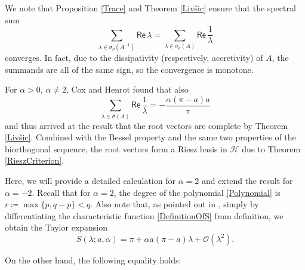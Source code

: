 \documentclass[11pt, a4paper,reqno]{amsart}
\theoremstyle{plain}
\theoremstyle{definition}
\theoremstyle{remark}
\newcommand{\1}{\mathds 1}
\renewcommand{\Re}{\mathsf{Re}\,}
\begin{document}
We note that Proposition \ref{Trace} and Theorem \ref{Livšic} ensure that the spectral sum
\[
\sum_{\lambda \in \sigma_p(A^{-1})}\Re \lambda = \sum_{\lambda \in \sigma_p(A)} \Re \frac{1}{\lambda}
\]
converges. In fact, due to the dissipativity (respectively, accretivity) of $A$, the summands are all of the same sign, so the convergence is monotone.

For $\alpha > 0$, $\alpha\neq 2$, Cox and Henrot found that also
\[
\sum_{\lambda\in\sigma(A)} \Re \frac{1}{\lambda} = -\frac{\alpha(\pi-a)a}{\pi}
\]
and thus arrived at the result that the root vectors are complete by Theorem \ref{Livšic}. Combined with the Bessel property and the same two properties of the biorthogonal sequence, the root vectors form a Riesz basis in $\mathcal H$ due to Theorem \ref{RieszCriterion}.

Here, we will provide a detailed calculation for $\alpha = 2$ and extend the result for $\alpha = -2$. Recall that for $\alpha = 2$, the degree of the polynomial \eqref{Polynomial} is $r \coloneqq \max\{p, q-p\} < q$. Also note that, as pointed out in \cite{CH}, simply by differentiating the characteristic function \eqref{DefinitionOfS} from definition, we obtain the Taylor expansion
\begin{equation}
S(\lambda; a, \alpha) = \pi + \alpha a(\pi-a)\lambda + \mathcal O(\lambda^2).
    \label{Taylor}
\end{equation}

On the other hand, the following equality holds:
\end{document}
